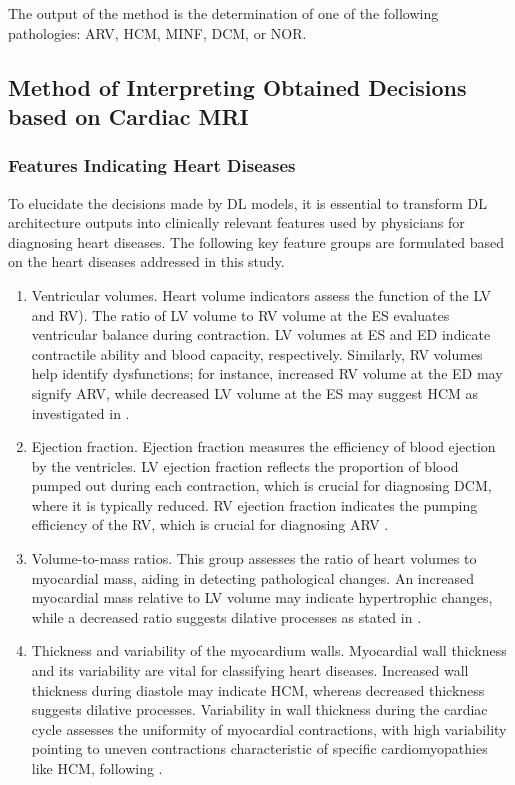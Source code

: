 \documentclass[fleqn,10pt]{wlscirep}
\begin{document}
The output of the method is the determination of one of the following pathologies: ARV, HCM, MINF, DCM, or NOR.

\subsection*{Method of Interpreting Obtained Decisions based on Cardiac MRI}

\subsubsection*{Features Indicating Heart Diseases}

To elucidate the decisions made by DL models, it is essential to transform DL architecture outputs into clinically relevant features used by physicians for diagnosing heart diseases. The following key feature groups are formulated based on the heart diseases addressed in this study.

\begin{enumerate}[label=Group \arabic*:, leftmargin=6em]
    \item Ventricular volumes. Heart volume indicators assess the function of the LV and RV). The ratio of LV volume to RV volume at the ES evaluates ventricular balance during contraction. LV volumes at ES and ED indicate contractile ability and blood capacity, respectively. Similarly, RV volumes help identify dysfunctions; for instance, increased RV volume at the ED may signify ARV, while decreased LV volume at the ES may suggest HCM as investigated in \cite{Izquierdo:2021,Afshin:2014}.
    \item Ejection fraction. Ejection fraction measures the efficiency of blood ejection by the ventricles. LV ejection fraction reflects the proportion of blood pumped out during each contraction, which is crucial for diagnosing DCM, where it is typically reduced. RV ejection fraction indicates the pumping efficiency of the RV, which is crucial for diagnosing ARV \cite{Afshin:2014}.
    \item Volume-to-mass ratios. This group assesses the ratio of heart volumes to myocardial mass, aiding in detecting pathological changes. An increased myocardial mass relative to LV volume may indicate hypertrophic changes, while a decreased ratio suggests dilative processes as stated in \cite{Zheng:2019,Afshin:2014}.
    \item Thickness and variability of the myocardium walls. Myocardial wall thickness and its variability are vital for classifying heart diseases. Increased wall thickness during diastole may indicate HCM, whereas decreased thickness suggests dilative processes. Variability in wall thickness during the cardiac cycle assesses the uniformity of myocardial contractions, with high variability pointing to uneven contractions characteristic of specific cardiomyopathies like HCM, following \cite{Izquierdo:2021}.
\end{enumerate}
\end{document}
